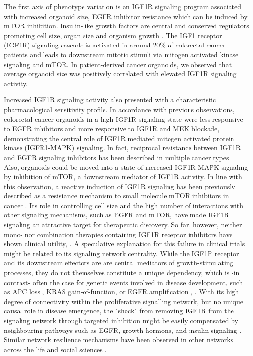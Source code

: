 \begin{flushleft}
The first axis of phenotype variation is an IGF1R signaling program associated with increased organoid size, EGFR inhibitor resistance which can be induced by mTOR inhibition. Insulin-like growth factors are central and conserved regulators promoting cell size, organ size and organism growth \citep{pucheHumanConditionsInsulinlike2012, sunMechanismCellSize2006}. The IGF1 receptor (IGF1R) signaling cascade is activated in around 20\% of colorectal cancer patients and leads to downstream mitotic stimuli via mitogen activated kinase signaling and mTOR\citep{zhongOverproductionIGF2Drives2017}. In patient-derived cancer organoids, we observed that average organoid size was positively correlated with elevated IGF1R signaling activity.
\smallbreak

Increased IGF1R signaling activity also presented with a characteristic pharmacological sensitivity profile. In accordance with previous observations\citep{yaoCombinedIGF1RMEK2016}, colorectal cancer organoids in a high IGF1R signaling state were less responsive to EGFR inhibitors and more responsive to IGF1R and MEK blockade, demonstrating the central role of IGF1R mediated mitogen activated protein kinase (IGFR1-MAPK) signaling. In fact, reciprocal resistance between IGF1R and EGFR signaling inhibitors has been described in multiple cancer types \citep{huaInsulinlikeGrowthFactor2020a}. Also, organoids could be moved into a state of increased IGF1R-MAPK signaling by inhibition of mTOR, a downstream mediator of IGF1R activity. In line with this observation, a reactive induction of IGF1R signaling has been previously described as a resistance mechanism to small molecule mTOR inhibitors in cancer \citep{sharma_chromatin-mediated_2010, yoonFocalAdhesionIGF1RDependent2017a}. Its role in controlling cell size and the high number of interactions with other signaling mechanisms, such as EGFR and mTOR, have made IGF1R signaling an attractive target for therapeutic discovery. So far, however, neither mono- nor combination therapies containing IGF1R receptor inhibitors have shown clinical utility\citep{beckwithMinireviewWereIGF2015}, \citep{CostsCausesOncologya}. A speculative explanation for this failure in clinical trials might be related to its signaling network centrality. While the IGF1R receptor and its downstream effectors are are central mediators of growth-stimulating processes, they do not themselves constitute a unique dependency, which is -in contrast- often the case for genetic events involved in disease development, such as APC loss \citep{Dow2015-pc}, KRAS gain-of-function, or EGFR amplification \citep{katoRevisitingEpidermalGrowth2019}, \citep{randonEGFRAmplificationMetastatic2021}. With its high degree of connectivity within the proliferative signalling network, but no unique causal role in disease emergence, the "shock" from removing IGF1R from the signaling network through targeted inhibition might be easily compensated by neighbouring pathways such as EGFR, growth hormone, and insulin signaling \citep{beckwithMinireviewWereIGF2015}. Similar network resilience mechanisms have been observed in other networks across the life and social sciences \citep{liuNetworkResilience2022a}.
\smallbreak


\end{flushleft}
